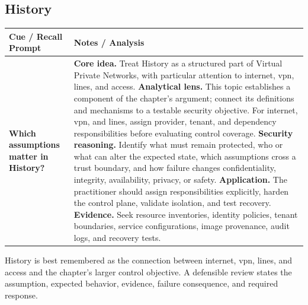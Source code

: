 \documentclass[11pt]{article}
\newcommand{\CornellHeader}{%
\rowcolor{Navy}\color{white}\bfseries Cue / Recall Prompt & \color{white}\bfseries Notes / Analysis\\\hline}
\newcommand{\CornellRow}[2]{%
\cellcolor{CueGray}\RaggedRight\textbf{#1} & \RaggedRight #2\\\hline}
\begin{document}
\subsection*{History}
\begin{longtable}{>{\RaggedRight\arraybackslash}p{}|>{\RaggedRight\arraybackslash}p{}}
\CornellHeader
\CornellRow{Which assumptions matter in History?}{\textbf{Core idea.} Treat History as a structured part of Virtual Private Networks, with particular attention to internet, vpn, lines, and access. \textbf{Analytical lens.} This topic establishes a component of the chapter's argument; connect its definitions and mechanisms to a testable security objective. For internet, vpn, and lines, assign provider, tenant, and dependency responsibilities before evaluating control coverage. \textbf{Security reasoning.} Identify what must remain protected, who or what can alter the expected state, which assumptions cross a trust boundary, and how failure changes confidentiality, integrity, availability, privacy, or safety. \textbf{Application.} The practitioner should assign responsibilities explicitly, harden the control plane, validate isolation, and test recovery. \textbf{Evidence.} Seek resource inventories, identity policies, tenant boundaries, service configurations, image provenance, audit logs, and recovery tests.}
\end{longtable}
\begin{topicsummary}
History is best remembered as the connection between internet, vpn, lines, and access and the chapter's larger control objective. A defensible review states the assumption, expected behavior, evidence, failure consequence, and required response.
\end{topicsummary}
\end{document}
